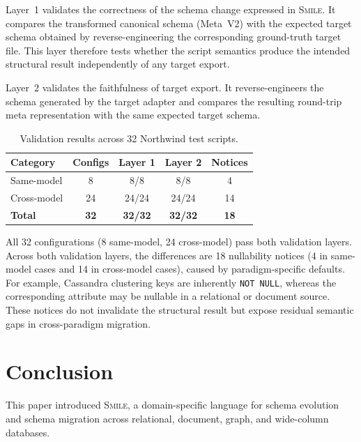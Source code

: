 \documentclass{llncs}
\begin{document}
Layer~1 validates the correctness of the schema change expressed in \textsc{Smile}.
It compares the transformed canonical schema (Meta~V2) with the expected target schema obtained by reverse-engineering the corresponding ground-truth target file.
This layer therefore tests whether the script semantics produce the intended structural result independently of any target export.

Layer~2 validates the faithfulness of target export.
It reverse-engineers the schema generated by the target adapter and compares the resulting round-trip meta representation with the same expected target schema.


\begin{table}[htbp]
\centering
\caption{Validation results across 32 Northwind test scripts.}
\label{tab:eval-results}
\renewcommand{\arraystretch}{1.15}
\begin{tabular}{l c c c c}
\toprule
\textbf{Category} & \textbf{Configs} & \textbf{Layer 1} & \textbf{Layer 2} & \textbf{Notices} \\
\midrule
Same-model          & 8  & 8/8   & 8/8   & 4  \\
Cross-model         & 24 & 24/24 & 24/24 & 14 \\
\midrule
\textbf{Total}      & \textbf{32} & \textbf{32/32} & \textbf{32/32} & \textbf{18} \\
\bottomrule
\end{tabular}
\end{table}

All 32 configurations (8 same-model, 24 cross-model) pass both validation layers.
Across both validation layers, the differences are 18 nullability notices (4 in same-model cases and 14 in cross-model cases), caused by paradigm-specific defaults.
For example, Cassandra clustering keys are inherently \texttt{NOT NULL}, whereas the corresponding attribute may be nullable in a relational or document source.
These notices do not invalidate the structural result but expose residual semantic gaps in cross-paradigm migration.
\section{Conclusion}
\label{sec:conclusion}

This paper introduced \textsc{Smile}, a domain-specific language for schema evolution and schema migration across relational, document, graph, and wide-column databases.
\end{document}
